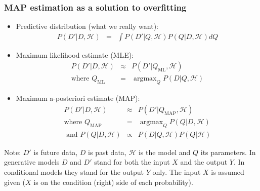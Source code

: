 \documentclass[ignorenonframetext,plain,fleqn]{beamer}
\DeclareMathOperator*{\argmax}{argmax}
\begin{document}
\begin{frame}\frametitle{MAP estimation as a solution to overfitting}
\begin{itemize}
\item Predictive distribution (what we really want):\begin{eqnarray*}
  P(D'|D,\mathcal{H}) &=& \int P(D'|Q,\mathcal{H}) P(Q|D,\mathcal{H}) dQ 
\end{eqnarray*}
\item Maximum likelihood estimate (MLE):\begin{eqnarray*}
  P(D'|D,\mathcal{H}) &\approx& P(D'|Q_\text{ML}, \mathcal{H}) \\
\mbox{where } Q_\text{ML} &=& \argmax_Q P(D|Q,\mathcal{H})
\end{eqnarray*}
\item Maximum a-posteriori estimate (MAP):\begin{eqnarray*}
  P(D'|D,\mathcal{H}) &\approx& P(D'|Q_\text{MAP}, \mathcal{H}) \\
\mbox{where } Q_\text{MAP} &=& \argmax_Q P(Q|D,\mathcal{H}) \\
\mbox{ and } P(Q|D,\mathcal{H}) &\propto& P(D|Q,\mathcal{H}) P(Q|\mathcal{H})
\end{eqnarray*}
\end{itemize}
\footnotesize Note: $D'$ is future data, $D$ is past data,
$\mathcal{H}$ is the model and $Q$ its parameters.  In generative
models $D$ and $D'$ stand for both the input $X$ and the output $Y$.
In conditional models they stand for the output $Y$ only.  The input
$X$ is assumed given ($X$ is on the condition (right) side of each
probability).
\end{frame}
\end{document}
